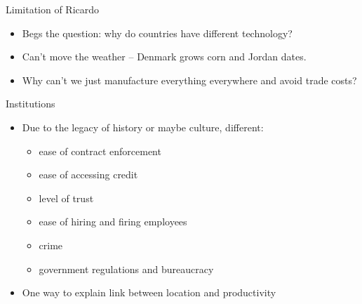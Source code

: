 \documentclass[ignorenonframetext,]{beamer}
\begin{document}
\begin{frame}{Limitation of Ricardo}

    \begin{itemize}
        \item Begs the question: why do countries have different technology?
        \item Can't move the weather -- Denmark grows corn and Jordan dates.
        \item Why can't we just manufacture everything everywhere and avoid trade costs?
    \end{itemize}

\end{frame}

\begin{frame}{Institutions}

    \begin{itemize}
        \item Due to the legacy of history or maybe culture, different:
        \begin{itemize}
            \item ease of contract enforcement
            \item ease of accessing credit 
            \item level of trust 
            \item ease of hiring and firing employees 
            \item crime 
            \item government regulations and bureaucracy 
        \end{itemize}
        \item One way to explain link between location and productivity
    \end{itemize}

\end{frame}
\end{document}
